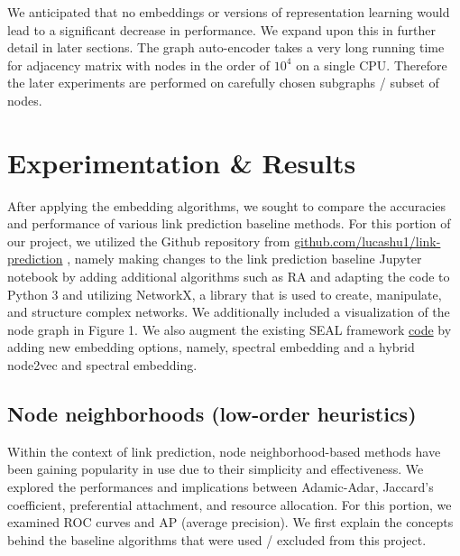 \documentclass[10pt,twocolumn,letterpaper]{article}
\begin{document}
We anticipated that no embeddings or versions of representation learning would lead to a significant decrease in performance. We expand upon this in further detail in later sections.
The graph auto-encoder takes a very long running time for adjacency matrix with nodes in the order of $10^4$ on a single CPU. Therefore the later experiments are performed on carefully chosen subgraphs / subset of nodes.




\section{Experimentation \& Results}

After applying the embedding algorithms, we sought to compare the accuracies and performance of various link prediction baseline methods. For this portion of our project, we utilized the Github repository from \href{https://github.com/lucashu1/link-prediction}{github.com/lucashu1/link-prediction} \cite{lucas-hu}, namely making changes to the link prediction baseline Jupyter notebook by adding additional algorithms such as RA and adapting the code to Python 3 and utilizing NetworkX, a library that is used to create, manipulate, and structure complex networks. We additionally included a visualization of the node graph in Figure 1. We also augment the existing SEAL framework \href{https://github.com/muhanzhang/SEAL}{code} \cite{SEAL} by adding new embedding options, namely, spectral embedding and a hybrid node2vec and spectral embedding.


\subsection{Node neighborhoods (low-order heuristics)}

Within the context of link prediction, node neighborhood-based methods have been gaining popularity in use due to their simplicity and effectiveness. We explored the performances and implications between Adamic-Adar, Jaccard's coefficient, preferential attachment, and resource allocation. For this portion, we examined ROC curves and AP (average precision).  We first explain the concepts behind the baseline algorithms that were used / excluded from this project.
\end{document}
